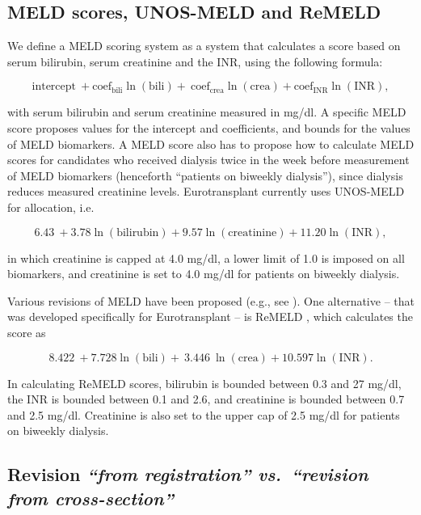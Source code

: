 \documentclass[11pt,twoside,]{book}
\begin{document}
\subsection{MELD scores, UNOS-MELD and ReMELD}\label{meld-scores-unos-meld-and-remeld}

We define a MELD scoring system as a system that calculates a score based
on serum bilirubin, serum creatinine and the INR, using the following formula:

\[\text{intercept}\  + \text{coef}_{\text{bili}}\ln\left( \text{bili} \right) + \ \text{coef}_{\text{crea}}\ln\left( \text{crea} \right) +
\text{coef}_{\text{INR}}\ln\left( \text{INR} \right),\]

with serum bilirubin and serum creatinine measured in mg/dl. A specific MELD
score proposes values for the intercept and coefficients, and bounds for the
values of MELD biomarkers. A MELD score also has to propose how to calculate
MELD scores for candidates who received dialysis twice in the week before
measurement of MELD biomarkers (henceforth ``patients on biweekly dialysis''),
since dialysis reduces measured creatinine levels. Eurotransplant currently uses UNOS-MELD for allocation, i.e.

\[6.43\  + 3.78\ln\left( \text{bilirubin} \right) + 9.57\ln\left( \text{creatinine} \right) + 11.20\ln\left( \text{INR} \right),\]

in which creatinine is capped at 4.0 mg/dl, a lower limit of 1.0 is imposed on
all biomarkers, and creatinine is set to 4.0 mg/dl for patients on biweekly
dialysis.

Various revisions of MELD have been proposed (e.g., see
\citep{leiseRevisedModelEndstage2011, goudsmitRefittingModelEndstage2020, bambhaPredictingSurvivalPatients2004}).
One alternative -- that was
developed specifically for Eurotransplant -- is ReMELD
\citep{goudsmitRefittingModelEndstage2020}, which calculates the score as

\[8.422\  + 7.728\ln\left( \text{bili} \right) + \ 3.446\ \ln\left( \text{crea} \right) + 10.597\ln\left( \text{INR} \right).\]

In calculating ReMELD scores, bilirubin is bounded between 0.3 and 27 mg/dl, the INR is
bounded between 0.1 and 2.6, and creatinine is bounded between 0.7 and 2.5 mg/dl. Creatinine is
also set to the upper cap of 2.5 mg/dl for patients on biweekly dialysis.

\subsection{\texorpdfstring{Revision \emph{``from registration'' vs.~``revision from cross-section''}}{Revision ``from registration'' vs.~``revision from cross-section''}}\label{revision-from-registration-vs.-revision-from-cross-section}
\end{document}
